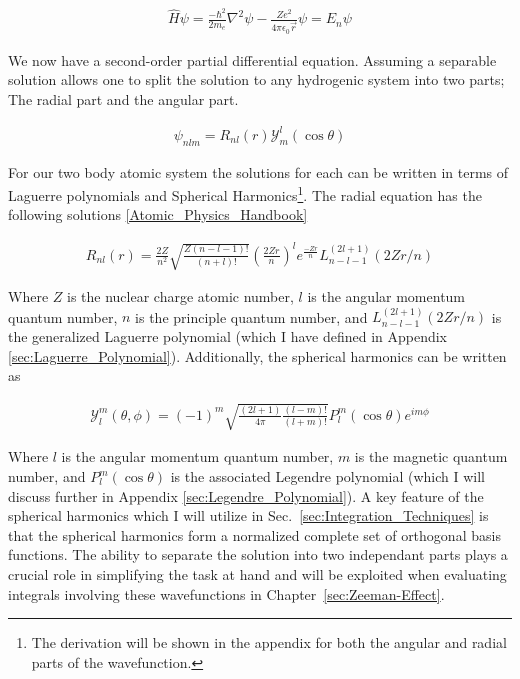         \begin{align}
            \hat{H} \psi  = \frac{-\hbar^2}{2m_e} \nabla^2 \psi -\frac{Z e^2}{4\pi \epsilon_0 \vec{r}} \psi = E_n \psi 
        \end{align}

        We now have a second-order partial differential equation. Assuming a separable solution allows one to split the solution to any hydrogenic system into two parts; The radial part and the angular part.

        \begin{align}
            \psi_{nlm} = R_{nl}(r) \mathcal{Y}^l_m (\cos \theta)
        \end{align}

        \noindent For our two body atomic system the solutions for each can be written in terms of Laguerre polynomials and Spherical Harmonics\footnote{The derivation will be shown in the appendix for both the angular and radial parts of the wavefunction.}. The radial equation has the following solutions \ref{Atomic_Physics_Handbook}

        \begin{align}
            R_{nl}(r) = \frac{2Z}{n^2} \sqrt{\frac{Z(n - l - 1)!}{(n + l)!}} \left( \frac{2Zr}{n} \right)^l e^{\frac{-Zr}{n}} L_{n - l - 1}^{(2l + 1)} \left( 2Zr/n \right) \label{eq:radial_equation}
        \end{align}

        Where $Z$ is the nuclear charge atomic number, $l$ is the angular momentum quantum number, $n$ is the principle quantum number, and $L_{n - l - 1}^{(2l + 1)} (2Zr/n)$ is the generalized Laguerre polynomial (which I have defined in Appendix \ref{sec:Laguerre_Polynomial}). Additionally, the spherical harmonics can be written as

        \begin{align}
            \mathcal{Y}^m_l (\theta, \phi) = (-1)^m \sqrt{\frac{(2l + 1)}{4 \pi}\frac{(l - m)!}{(l + m)!}} P_l^m (\cos \theta) e^{i m \phi} \label{eq:angular_equation}
        \end{align}

        Where $l$ is the angular momentum quantum number, $m$ is the magnetic quantum number, and $P_l^m (\cos \theta)$ is the associated Legendre polynomial (which I will discuss further in Appendix \ref{sec:Legendre_Polynomial}). A key feature of the spherical harmonics which I will utilize in Sec.~\ref{sec:Integration_Techniques} is that the spherical harmonics form a normalized complete set of orthogonal basis functions. The ability to separate the solution into two independant parts plays a crucial role in simplifying the task at hand and will be exploited when evaluating integrals involving these wavefunctions in Chapter~\ref{sec:Zeeman-Effect}.


